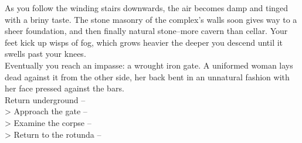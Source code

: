 As you follow the winding stairs downwards, the air becomes damp and tinged with a briny taste. The stone masonry of the complex's walls soon gives way to a sheer foundation, and then finally natural stone--more cavern than cellar. Your feet kick up wisps of fog, which grows heavier the deeper you descend until it swells past your knees.\\

Eventually you reach an impasse: a wrought iron gate. A uniformed woman lays dead against it from the other side, her back bent in an unnatural fashion with her face pressed against the bars.\\

 Return underground -- \\
> Approach the gate -- \\
> Examine the corpse -- \\
> Return to the rotunda -- 